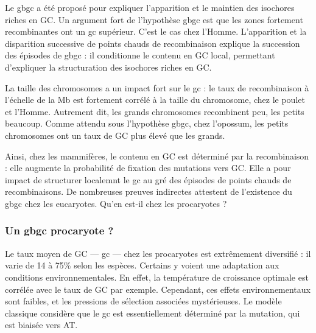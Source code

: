 \documentclass[11pt, oneside]{scrartcl}
\begin{document}
Le \ac{gbgc} a été proposé pour expliquer l'apparition et le maintien des isochores
riches en GC\cite{duret_new_2006}. Un argument fort de l'hypothèse \ac{gbgc} est que
les zones fortement recombinantes ont un \ac{gc} supérieur. C'est le cas chez
l'Homme\cite{duret_impact_2008, berglund_hotspots_2009}. L'apparition et la
disparition successive de points chauds de recombinaison explique la succession
des épisodes de \ac{gbgc} : il conditionne le contenu en GC local, permettant
d'expliquer la structuration des isochores riches en GC. 

La taille des chromosomes a un impact fort sur le \ac{gc} : le taux de
recombinaison à l'échelle de la Mb est fortement corrélé à la taille du
chromosome, chez le poulet et l'Homme\cite{kaback_chromosome_1999}. Autrement
dit, les grands chromosomes recombinent peu, les petits beaucoup. Comme attendu
sous l'hypothèse \ac{gbgc}, chez l'opossum, les petits chromosomes ont un taux
de GC plus élevé que les grands.

\begin{transition}
  Ainsi, chez les mammifères, le contenu en GC est déterminé par la
  recombinaison : elle augmente la probabilité de fixation des mutations vers
  GC. Elle a pour impact de structurer localemnt le \ac{gc} au gré des épisodes
  de points chauds de recombinaisons. De nombreuses preuves indirectes attestent
  de l'existence du \ac{gbgc} chez les eucaryotes. Qu'en est-il chez les
  procaryotes ?
\end{transition}

\subsubsection{Un \ac{gbgc} procaryote ?}
\label{sec:orgheadline13}
Le taux moyen de GC --- \ac{gc} --- chez les procaryotes est extrêmement
diversifié : il varie de 14 à 75\% selon les
espèces\cite{mccutcheon_functional_2010}. Certains y voient une adaptation aux
conditions environnementales. En effet, la température de croissance optimale
est corrélée avec le taux de GC par exemple. Cependant, ces effets
environnementaux sont faibles, et les pressions de sélection associées
mystérieuses. Le modèle classique considère que le \ac{gc} est essentiellement
déterminé par la mutation, qui est biaisée vers
AT\cite{hershberg_evidence_2010,sueoka_directional_1988}.
\end{document}
